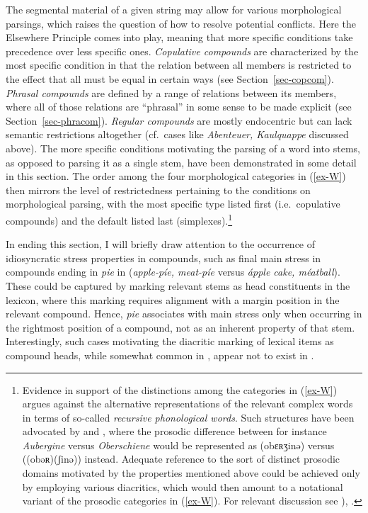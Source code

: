 \documentclass[output=paper
 ,nobabel
 ,draftmode
 ,colorlinks, citecolor=brown
]{langscibook}
\begin{document}
\noindent
The segmental material of a given string may allow for various morphological parsings, which raises
the question of how to resolve potential conflicts. Here the Elsewhere Principle comes into play,
meaning that more specific conditions take precedence over less specific ones. \emph{Copulative
  compounds} are characterized by the most specific condition in that the relation between all
members is restricted to the effect that all must be equal in certain ways (see
Section~\ref{sec-copcom}). \emph{Phrasal compounds} are defined by a range of relations between its
members, where all of those relations are ``phrasal'' in some sense to be made explicit (see
Section~\ref{sec-phracom}). \emph{Regular compounds} are mostly endocentric but can lack semantic
restrictions altogether (cf.\ cases like \emph{Abenteuer, Kaulquappe} discussed above). The more
specific conditions motivating the parsing of a word into stems, as opposed to parsing it as a
single stem, have been demonstrated in some detail in this section. The order among the four
morphological categories in (\ref{ex-W}) then mirrors the level of restrictedness pertaining to the
conditions on morphological parsing, with the most specific type listed first (i.e.\ copulative
compounds) and the default listed last (simplexes).\footnote{\label{fn-any-evidence}Evidence in
  support of the distinctions among the categories in (\ref{ex-W}) argues against the alternative
  representations of the relevant complex words in terms of so-called \emph{recursive phonological
    words}. Such structures have been advocated by \citet[6]{McCarthyPrince1993} and
  \citet{ItoMester2009}, where the prosodic difference between for instance \emph{Aubergine} versus
  \emph{Oberschiene} would be represented as (obɛʀʒinə) versus
  ((obəʀ)(ʃinə)) instead. Adequate reference to the sort of distinct prosodic
  domains motivated by the properties mentioned above could be achieved only by employing various
  diacritics, which would then amount to a notational variant of the prosodic categories in
  (\ref{ex-W}). For relevant discussion see \citep[xvii]{NesporVogel2007}),
  \citep[150--152]{Vogel2010}.}  


In ending this section, I will briefly draw attention to the occurrence of idiosyncratic stress properties in compounds, such as final main stress in compounds ending in \emph{pie} in  (\eg \emph{apple-píe,  meat-píe} versus \emph{ápple cake, méatball}). These could be captured by marking relevant stems as head constituents in the lexicon, where this marking requires alignment with a margin position in the relevant compound. Hence, \emph{pie} associates with main stress only when occurring in the rightmost position of a compound, not as an inherent property of that stem. Interestingly, such cases motivating the diacritic marking of lexical items as compound heads, while somewhat common in  \citep[144--149]{Fudge1984}, appear not to exist in .
\end{document}
